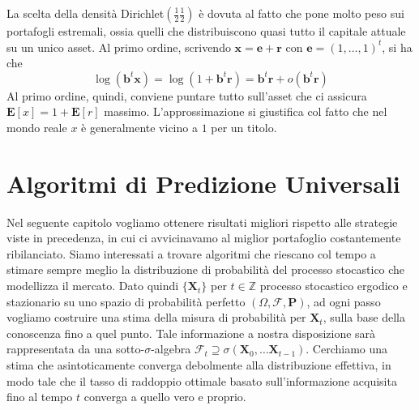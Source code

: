 \documentclass[a4paper,11pt]{book}
\theoremstyle{plain}
\theoremstyle{definition}
\theoremstyle{remark}
\newcommand{\Z}{\mathbb{Z}}
\newcommand{\X}{\bm{X}}
\newcommand{\x}{\bm{x}}
\newcommand{\B}{\bm{b}}
\newcommand{\F}{\mathcal{F}}
\newcommand{\Pro}{\mathbf{P}}
\newcommand{\E}{\mathbf{E}}
\begin{document}
La scelta della densità Dirichlet$\left(\frac{1}{2}\frac{1}{2}\right)$ è dovuta al fatto che pone molto peso sui portafogli estremali, ossia quelli che distribuiscono quasi tutto il capitale attuale su un unico asset. Al primo ordine, scrivendo $\x = \bm{e}+\bm{r}$ con $\bm{e} = (1,\ldots,1)^t$, si ha che
\begin{equation*}
	\log(\B^t\x)=\log(1+\B^t\bm{r})=\B^t\bm{r}+o(\B^t\bm{r})
\end{equation*}
Al primo ordine, quindi, conviene puntare tutto sull'asset che ci assicura $\E[x]=1+\E[r]$ massimo. L'approssimazione si giustifica col fatto che nel mondo reale $x$ è generalmente vicino a $1$ per un titolo.

\chapter{Algoritmi di Predizione Universali}
Nel seguente capitolo vogliamo ottenere risultati migliori rispetto alle strategie viste in precedenza, in cui ci avvicinavamo al miglior portafoglio costantemente ribilanciato. \newline
Siamo interessati a trovare algoritmi che riescano col tempo a stimare sempre meglio la distribuzione di probabilità del processo stocastico che modellizza il mercato.\newline
Dato quindi $\{\X_t\}$ per $t\in\Z$ processo stocastico ergodico e stazionario su uno spazio di probabilità perfetto $(\Omega,\F,\Pro)$, ad ogni passo vogliamo costruire una stima della misura di probabilità per $\X_t$, sulla base della conoscenza fino a quel punto. Tale informazione a nostra disposizione sarà rappresentata da una sotto-$\sigma$-algebra $\F_t\supseteq \sigma(\X_0,\ldots\X_{t-1})$. Cerchiamo una stima che asintoticamente converga debolmente alla distribuzione effettiva, in modo tale che il tasso di raddoppio ottimale basato sull'informazione acquisita fino al tempo $t$ converga a quello vero e proprio.\newline
\end{document}
